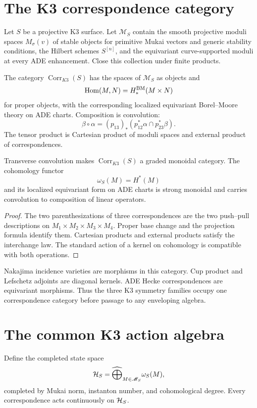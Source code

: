 \chapter{The K3 correspondence category}
Let $S$ be a projective K3 surface.  Let $\mathscr M_S$ contain the smooth projective moduli spaces $M_\sigma(v)$ of stable objects for primitive Mukai vectors and generic stability conditions, the Hilbert schemes $S^{[n]}$, and the equivariant curve-supported moduli at every ADE enhancement.  Close this collection under finite products.

\begin{definition}
The category $\operatorname{Corr}_{K3}(S)$ has the spaces of $\mathscr M_S$ as objects and
\[
 \operatorname{Hom}(M,N)=H^{\mathrm{BM}}_*(M\times N)
\]
for proper objects, with the corresponding localized equivariant Borel--Moore theory on ADE charts.  Composition is convolution:
\[
 \beta\circ\alpha
 =(p_{13})_*
 \left(p_{12}^*\alpha\cap p_{23}^*\beta\right).
\]
The tensor product is Cartesian product of moduli spaces and external product of correspondences.
\end{definition}

\begin{theorem}
Transverse convolution makes $\operatorname{Corr}_{K3}(S)$ a graded monoidal category.  The cohomology functor
\[
 \omega_S(M)=H^*(M)
\]
and its localized equivariant form on ADE charts is strong monoidal and carries convolution to composition of linear operators.
\end{theorem}
\begin{proof}
The two parenthesizations of three correspondences are the two push--pull descriptions on $M_1\times M_2\times M_3\times M_4$.  Proper base change and the projection formula identify them.  Cartesian products and external products satisfy the interchange law.  The standard action of a kernel on cohomology is compatible with both operations.
\end{proof}

Nakajima incidence varieties are morphisms in this category.  Cup product and Lefschetz adjoints are diagonal kernels.  ADE Hecke correspondences are equivariant morphisms.  Thus the three K3 symmetry families occupy one correspondence category before passage to any enveloping algebra.

\chapter{The common K3 action algebra}
Define the completed state space
\[
 \mathcal H_S=
 \widehat\bigoplus_{M\in\mathscr M_S}\omega_S(M),
\]
completed by Mukai norm, instanton number, and cohomological degree.  Every correspondence acts continuously on $\mathcal H_S$.

